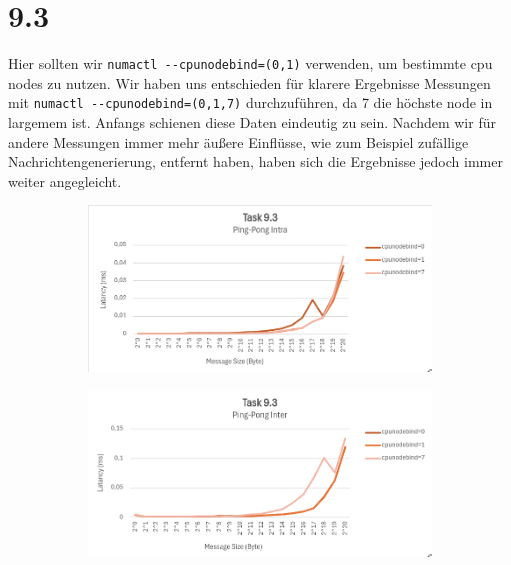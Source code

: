 \documentclass{report}
\begin{document}
\section*{9.3}
Hier sollten wir \verb|numactl --cpunodebind=(0,1)| verwenden, um bestimmte cpu 
nodes zu nutzen. Wir haben uns entschieden für klarere
Ergebnisse Messungen mit \verb|numactl --cpunodebind=(0,1,7)| durchzuführen, da 
7 die höchste node in largemem ist. Anfangs schienen diese
Daten eindeutig zu sein. Nachdem wir für andere Messungen immer mehr äußere 
Einflüsse, wie zum Beispiel zufällige Nachrichtengenerierung, entfernt
haben, haben sich die Ergebnisse jedoch immer weiter angegleicht.
\begin{figure}[h]
	\begin{subfigure}{.5\textwidth}
		\centering
		\includegraphics[width=\textwidth]{cpunodebind0}
	\end{subfigure}
	\begin{subfigure}{.5\textwidth}
		\centering
		\includegraphics[width=\textwidth]{cpunodebind1}
	\end{subfigure}
\end{figure}
\end{document}
